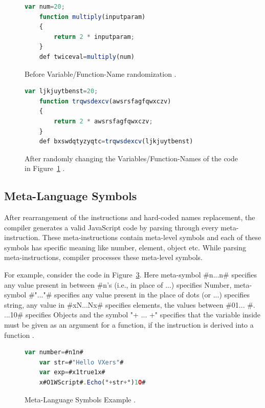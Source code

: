 \begin{figure}
  \centering
  \begin{lstlisting}[language=JavaScript]
	var num=20;
	function multiply(inputparam) 
	{ 
		return 2 * inputparam; 
	}
	def twiceval=multiply(num)
\end{lstlisting}
    \caption[Before Variable/Function-Name randomization]{Before Variable/Function-Name randomization \cite{bib26}.}
    \label{fig:randomization}
\end{figure}

\begin{figure}
  \centering
  \begin{lstlisting}[language=JavaScript]
	var ljkjuytbenst=20;
	function trqwsdexcv(awsrsfagfqwxczv) 
	{ 
		return 2 * awsrsfagfqwxczv; 
	}
	def bxswdqtyzyqtc=trqwsdexcv(ljkjuytbenst)
\end{lstlisting}
    \caption[After Variable/Function-Name randomization]{After randomly changing the Variables/Function-Names of the code in Figure~\ref{fig:randomization} \cite{bib26}.}
    \label{fig:afterrandomization}
\end{figure}

\subsection{Meta-Language Symbols}

After rearrangement of the instructions and hard-coded names replacement, the compiler generates a valid JavaScript code by parsing through every meta-instruction. These meta-instructions contain meta-level symbols and each of these symbols has specific meaning like number, element, object etc. While parsing meta-instructions, compiler processes these meta-level symbols.

For example, consider the code in Figure~\ref{fig:metalanguage}. Here meta-symbol \#n...n\# specifies any value present in between \#n's (i.e., in place of ...) specifies Number, meta-symbol \#"..."\# specifies any value present in the place of dots (or ...) specifies string, any value in \#xN...Nx\# specifies elements, the values between \#01... \#. ...10\# specifies Objects and the symbol "\textdegree+ ... +\textdegree" specifies that the variable inside must be given as an argument for a function, if the instruction is derived into a function \cite{bib26}.

\begin{figure}
  \centering
  \begin{lstlisting}[language=JavaScript]
	var number=#n1n#					
	var str=#"Hello VXers"#				
	var exp=#x1true1x#					
	x#O1WScript#.Echo(°+str+°)1O#
\end{lstlisting}
    \caption[Meta-Language Symbols Example]{Meta-Language Symbols Example \cite{bib26}.}
    \label{fig:metalanguage}
\end{figure}

